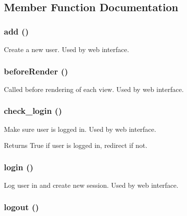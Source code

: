 \subsection{Member Function Documentation}
\hypertarget{class_users_controller_a837ba24a1c3095ae67613238d866f79a}{
\subsubsection[{add}]{\setlength{\rightskip}{0pt plus 5cm}add ()}}
\label{class_users_controller_a837ba24a1c3095ae67613238d866f79a}
Create a new user. Used by web interface. \hypertarget{class_users_controller_ac89dd29d2229bbc37879d31f95d06e97}{
\subsubsection[{beforeRender}]{\setlength{\rightskip}{0pt plus 5cm}beforeRender ()}}
\label{class_users_controller_ac89dd29d2229bbc37879d31f95d06e97}
Called before rendering of each view. Used by web interface. \hypertarget{class_users_controller_a648185926782004aa207e8bdfdfe8197}{
\subsubsection[{check\_\-login}]{\setlength{\rightskip}{0pt plus 5cm}check\_\-login ()}}
\label{class_users_controller_a648185926782004aa207e8bdfdfe8197}
Make sure user is logged in. Used by web interface. \begin{DoxyReturn}{Returns}
True if user is logged in, redirect if not. 
\end{DoxyReturn}
\hypertarget{class_users_controller_aa311da27ba5706f5710cea7706c8eae1}{
\subsubsection[{login}]{\setlength{\rightskip}{0pt plus 5cm}login ()}}
\label{class_users_controller_aa311da27ba5706f5710cea7706c8eae1}
Log user in and create new session. Used by web interface. \hypertarget{class_users_controller_a082405d89acd6835c3a7c7a08a7adbab}{
\subsubsection[{logout}]{\setlength{\rightskip}{0pt plus 5cm}logout ()}}
